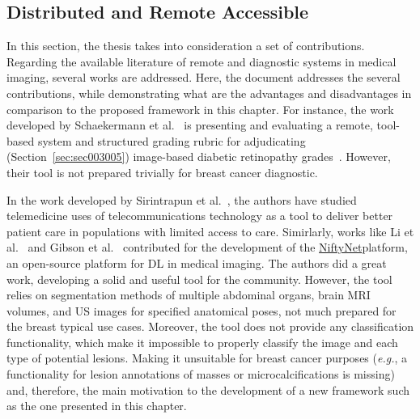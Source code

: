 \subsection{Distributed and Remote Accessible}
\label{sec:sec004002004}

In this section, the thesis takes into consideration a set of contributions.
Regarding the available literature of remote and diagnostic systems in medical imaging, several works are addressed.
Here, the document addresses the several contributions, while demonstrating what are the advantages and disadvantages in comparison to the proposed framework in this chapter.
For instance, the work developed by Schaekermann et al.~\cite{10.1167/tvst.8.6.40} is presenting and evaluating a remote, tool-based system and structured grading rubric for adjudicating (Section~\ref{sec:sec003005}) image-based diabetic retinopathy grades~\cite{10.1145/3359178}.
However, their tool is not prepared trivially for breast cancer diagnostic.

In the work developed by Sirintrapun et al.~\cite{10.1200EDBK200141}, the authors have studied telemedicine uses of telecommunications technology as a tool to deliver better patient care in populations with limited access to care.
Simirlarly, works like Li et al.~\cite{10.1007/978-3-319-59050-9_28} and Gibson et al.~\cite{GIBSON2018113} contributed for the development of the \href{https://github.com/NifTK/NiftyNet}{NiftyNet}\footnotemark[11] platform, an open-source platform for \ac{DL} in medical imaging.
The authors did a great work, developing a solid and useful tool for the community.
However, the tool relies on segmentation methods of multiple abdominal organs, brain \ac{MRI} volumes, and \ac{US} images for specified anatomical poses, not much prepared for the breast typical use cases.
Moreover, the tool does not provide any classification functionality, which make it impossible to properly classify the image and each type of potential lesions.
Making it unsuitable for breast cancer purposes ({\it e.g.}, a functionality for lesion annotations of masses or microcalcifications is missing) and, therefore, the main motivation to the development of a new framework such as the one presented in this chapter.



